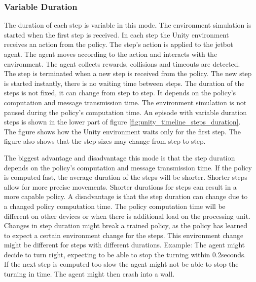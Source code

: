 


\subsubsection{Variable Duration}

The duration of each step is variable in this mode. The environment simulation is started when the first step is received. In each step the Unity environment receives an action from the policy. The step's action is applied to the jetbot agent. The agent moves according to the action and interacts with the environment. The agent collects rewards, collisions and timeouts are detected. The step is terminated when a new step is received from the policy. The new step is started instantly, there is no waiting time between steps. 
The duration of the steps is not fixed, it can change from step to step. It depends on the policy's computation and message transmission time. The environment simulation is not paused during the policy's computation time. 
An episode with variable duration steps is shown in the lower part of figure \ref{fig:unity_timeline_steps_duration}. The figure shows how the Unity environment waits only for the first step. The figure also shows that the step sizes may change from step to step.

The biggest advantage and disadvantage this mode is that the step duration depends on the policy's computation and message transmission time. If the policy is computed fast, the average duration of the steps will be shorter. Shorter steps allow for more precise movements. Shorter durations for steps can result in a more capable policy.
A disadvantage is that the step duration can change due to a changed policy computation time. The policy computation time will be different on other devices or when there is additional load on the processing unit.
Changes in step duration might break a trained policy, as the policy has learned to expect a certain environment change for the steps. This environment change might be different for steps with different durations. 
Example: The agent might decide to turn right, expecting to be able to stop the turning within 0.2seconds. If the next step is computed too slow the agent might not be able to stop the turning in time. The agent might then crash into a wall.


